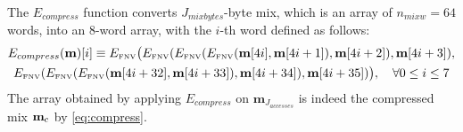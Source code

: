 The $E_{compress}$ function converts $J_{mixbytes}$-byte mix,
which is an array of $n_{mixw}=64$ words,
into an 8-word array, with the $i$-th word defined as follows:
\begin{multline}
	E_{compress}(\mathbf{m})[i] \equiv E_\text{\tiny FNV}\big(E_\text{\tiny FNV}(E_\text{\tiny FNV}(E_\text{\tiny FNV}(\mathbf{m}[4i], \mathbf{m}[4i + 1]), \mathbf{m}[4i + 2]), \mathbf{m}[4i + 3]), \\
	E_\text{\tiny FNV}(E_\text{\tiny FNV}(E_\text{\tiny FNV}(\mathbf{m}[4i+32], \mathbf{m}[4i +33]), \mathbf{m}[4i + 34]), \mathbf{m}[4i + 35])\big), \quad \forall 0\le i \le 7
\end{multline}
The array obtained by applying $E_{compress}$ on $\mathbf{m}_{J_{accesses}}$ is indeed the compressed mix $\mathbf{m}_{\mathrm{c}}$ by \cref{eq:compress}.


